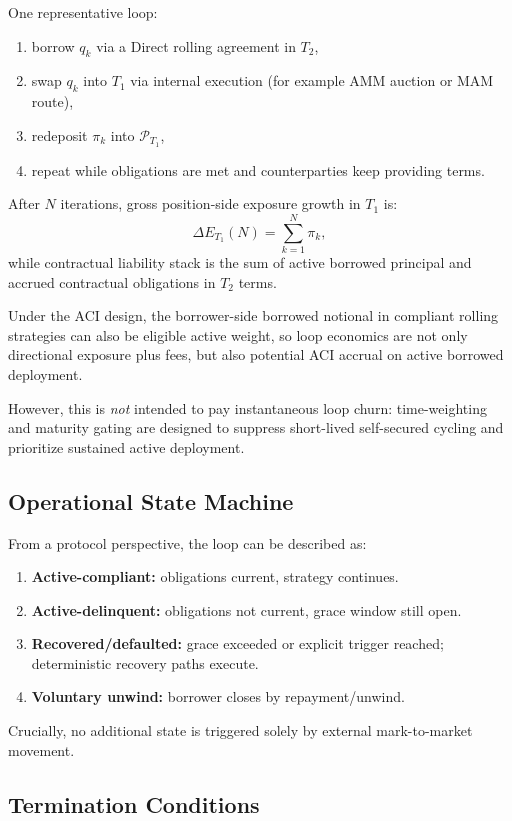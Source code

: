 \documentclass[version=preprint]{iacrcc}
\begin{document}
One representative loop:
\begin{enumerate}
  \item borrow $q_k$ via a Direct rolling agreement in $T_2$,
  \item swap $q_k$ into $T_1$ via internal execution (for example AMM auction or MAM route),
  \item redeposit $\pi_k$ into $\mathcal{P}_{T_1}$,
  \item repeat while obligations are met and counterparties keep providing terms.
\end{enumerate}

After $N$ iterations, gross position-side exposure growth in $T_1$ is:
\[
\Delta E_{T_1}(N)=\sum_{k=1}^{N}\pi_k,
\]
while contractual liability stack is the sum of active borrowed principal and accrued contractual obligations in $T_2$ terms.

Under the ACI design, the borrower-side borrowed notional in compliant rolling strategies can also be eligible active weight, so loop economics are not only directional exposure plus fees, but also potential ACI accrual on active borrowed deployment.

However, this is \emph{not} intended to pay instantaneous loop churn: time-weighting and maturity gating are designed to suppress short-lived self-secured cycling and prioritize sustained active deployment.

\subsection{Operational State Machine}

From a protocol perspective, the loop can be described as:
\begin{enumerate}
  \item \textbf{Active-compliant:} obligations current, strategy continues.
  \item \textbf{Active-delinquent:} obligations not current, grace window still open.
  \item \textbf{Recovered/defaulted:} grace exceeded or explicit trigger reached; deterministic recovery paths execute.
  \item \textbf{Voluntary unwind:} borrower closes by repayment/unwind.
\end{enumerate}

Crucially, no additional state is triggered solely by external mark-to-market movement.

\subsection{Termination Conditions}
\end{document}
